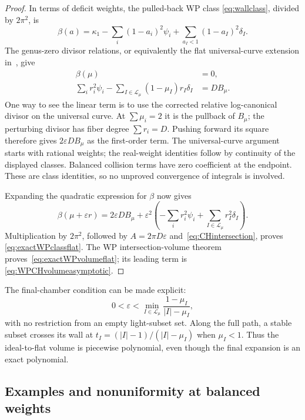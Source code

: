 \documentclass[11pt,a4paper]{article}
\numberwithin{equation}{section}
\theoremstyle{definition}
\theoremstyle{remark}
\begin{document}
\begin{proof}
In terms of deficit weights, the pulled-back WP class
\eqref{eq:wallclass}, divided by $2\pi^2$, is
\[
 \beta(a)=\kappa_1-\sum_i(1-a_i)^2\psi_i+
           \sum_{a_I<1}(1-a_I)^2\delta_I.
\]
The genus-zero divisor relations, or equivalently the flat
universal-curve extension in~\cite[Section 8]{KoziarzNguyen}, give
\begin{align*}
 \beta(\mu)&=0,\\
 \sum_i r_i^2\psi_i-
   \sum_{I\in\mathcal L_\mu}(1-\mu_I)r_I\delta_I&=D B_\mu.
\end{align*}
One way to see the linear term is to use the corrected relative
log-canonical divisor on the universal curve. At $\sum\mu_i=2$
it is the pullback of $B_\mu$; the perturbing divisor has fiber
degree $\sum r_i=D$. Pushing forward its square therefore gives
$2\varepsilon D B_\mu$ as the first-order term. The universal-curve argument starts with rational weights; the
real-weight identities follow by continuity of the displayed
classes. Balanced collision terms have zero coefficient at the
endpoint. These are class identities, so no unproved convergence
of integrals is involved.

Expanding the quadratic expression for $\beta$ now gives
\[
 \beta(\mu+\varepsilon r)=2\varepsilon D B_\mu+
 \varepsilon^2\left(-\sum_i r_i^2\psi_i+
                \sum_{I\in\mathcal L_\mu}r_I^2\delta_I\right).
\]
Multiplication by $2\pi^2$, followed by
$A=2\pi D\varepsilon$ and~\eqref{eq:CHintersection}, proves
\eqref{eq:exactWPclassflat}. The WP intersection-volume theorem
\cite{AMN} proves~\eqref{eq:exactWPvolumeflat}; its leading term is
\eqref{eq:WPCHvolumeasymptotic}.
\end{proof}

The final-chamber condition can be made explicit:
\begin{equation}
 0<\varepsilon<
 \min_{I\in\mathcal L_\mu}\frac{1-\mu_I}{|I|-\mu_I},
 \label{eq:finalchamberwidth}
\end{equation}
with no restriction from an empty light-subset set. Along the full
path, a stable subset crosses its wall at
$t_I=(|I|-1)/(|I|-\mu_I)$ when $\mu_I<1$. Thus the ideal-to-flat
volume is piecewise polynomial, even though the final expansion is
an exact polynomial.

\subsection{Examples and nonuniformity at balanced weights}
\end{document}
